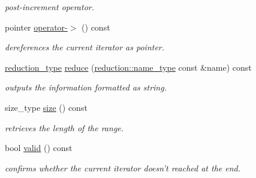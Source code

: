 \begin{DoxyCompactItemize}
\begin{DoxyCompactList}\small\item\em post-\/increment operator. \end{DoxyCompactList}\item 
\hypertarget{classhryky_1_1_foreach_a14234edb35e385a4d5ced44f41571bf8}{pointer \hyperlink{classhryky_1_1_foreach_a14234edb35e385a4d5ced44f41571bf8}{operator-\/$>$} () const }\label{classhryky_1_1_foreach_a14234edb35e385a4d5ced44f41571bf8}

\begin{DoxyCompactList}\small\item\em dereferences the current iterator as pointer. \end{DoxyCompactList}\item 
\hypertarget{classhryky_1_1_foreach_a13a52462dd8b0dddf02ea2784517bf7a}{\hyperlink{namespacehryky_a343a9a4c36a586be5c2693156200eadc}{reduction\-\_\-type} \hyperlink{classhryky_1_1_foreach_a13a52462dd8b0dddf02ea2784517bf7a}{reduce} (\hyperlink{namespacehryky_1_1reduction_ac686c30a4c8d196bbd0f05629a6b921f}{reduction\-::name\-\_\-type} const \&name) const }\label{classhryky_1_1_foreach_a13a52462dd8b0dddf02ea2784517bf7a}

\begin{DoxyCompactList}\small\item\em outputs the information formatted as string. \end{DoxyCompactList}\item 
\hypertarget{classhryky_1_1_foreach_a4f53055669dda7a72378659f24e21418}{size\-\_\-type \hyperlink{classhryky_1_1_foreach_a4f53055669dda7a72378659f24e21418}{size} () const }\label{classhryky_1_1_foreach_a4f53055669dda7a72378659f24e21418}

\begin{DoxyCompactList}\small\item\em retrieves the length of the range. \end{DoxyCompactList}\item 
\hypertarget{classhryky_1_1_foreach_a45a07a1b312298448623a13c0e626d3a}{bool \hyperlink{classhryky_1_1_foreach_a45a07a1b312298448623a13c0e626d3a}{valid} () const }\label{classhryky_1_1_foreach_a45a07a1b312298448623a13c0e626d3a}

\begin{DoxyCompactList}\small\item\em confirms whether the current iterator doesn't reached at the end. \end{DoxyCompactList}\end{DoxyCompactItemize}
